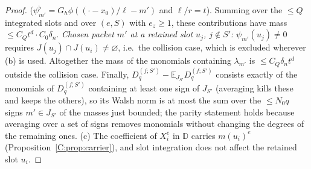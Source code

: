 \documentclass[11pt]{article}
\newcommand{\E}{\mathbb{E}}
\begin{document}
\begin{proof}
(\(\psi^\flat_{m'}=G_h\phi((\cdot-x_0)/\ell-m')\) and \(\ell/r=t\)).  Summing
over the \(\le Q\) integrated slots and over \((e,S)\) with \(e_z\ge1\), these
contributions have mass \(\le C_Qt^d\cdot C_0\delta_n\).
\emph{Chosen packet \(m'\) at a retained slot \(u_j\), \(j\notin S'\):}
\(\psi_{m'}(u_j)\ne0\) requires \(J(u_j)\cap J(u_i)\ne\varnothing\), i.e.\ the
collision case, which is excluded wherever (b) is used.
Altogether the mass of the monomials containing \(\lambda_{m'}\) is
\(\le C_Q\delta_nt^d\) outside the collision case.  Finally,
\(D_q^{(f;S')}-\E_{J_{S'}}D_q^{(f;S')}\) consists exactly of the monomials of
\(D_q^{(f;S')}\) containing at least one sign of \(J_{S'}\) (averaging kills
these and keeps the others), so its Walsh norm is at most the sum over the
\(\le N_0q\) signs \(m'\in J_{S'}\) of the masses just bounded; the parity
statement holds because averaging over a set of signs removes monomials
without changing the degrees of the remaining ones.
(c) The coefficient of \(X_i^e\) in \(\mathbb D\) carries \(m(u_i)^e\)
(Proposition~\ref{C:prop:carrier}), and slot integration does not affect
the retained slot \(u_i\).
\end{proof}
\end{document}
